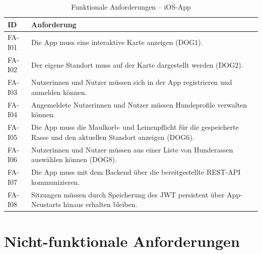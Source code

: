 \begin{table}[H]
  \centering
  \caption{Funktionale Anforderungen – iOS-App}
  \label{tab:fa-ios}
  \begin{tabularx}{\textwidth}{|l|Y|}
    \hline
    \textbf{ID} & \textbf{Anforderung} \\
    \hline
    FA-I01 & Die App muss eine interaktive Karte anzeigen (DOG1). \\
    \hline
    FA-I02 & Der eigene Standort muss auf der Karte dargestellt werden (DOG2). \\
    \hline
    FA-I03 & Nutzer\-innen und Nutzer müssen sich in der App registrieren und anmelden
             können. \\
    \hline
    FA-I04 & Angemeldete Nutzer\-innen und Nutzer müssen Hundeprofile verwalten können. \\
    \hline
    FA-I05 & Die App muss die Maulkorb- und Leinenpflicht für die gespeicherte Rasse und
             den aktuellen Standort anzeigen (DOG6). \\
    \hline
    FA-I06 & Nutzer\-innen und Nutzer müssen aus einer Liste von Hunderassen auswählen
             können (DOG8). \\
    \hline
    FA-I07 & Die App muss mit dem Backend über die bereitgestellte REST-API kommunizieren. \\
    \hline
    FA-I08 & Sitzungen müssen durch Speicherung des JWT persistent über App-Neustarts
             hinaus erhalten bleiben. \\
    \hline
  \end{tabularx}
\end{table}

\section{Nicht-funktionale Anforderungen}
\label{sec:nfas}

